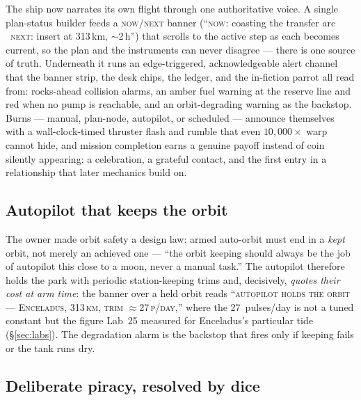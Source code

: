 \documentclass[10pt,twocolumn]{article}
\begin{document}
The ship now narrates its own flight through one authoritative voice. A single
plan-status builder feeds a \textsc{now}/\textsc{next} banner (``\textsc{now}: coasting the
transfer arc \textperiodcentered\ \textsc{next}: insert at 313\,km, $\sim$2\,h'') that
scrolls to the active step as each becomes current, so the plan and the instruments can
never disagree --- there is one source of truth. Underneath it runs an edge-triggered,
acknowledgeable alert channel that the banner strip, the desk chips, the ledger, and the
in-fiction parrot all read from: rocks-ahead collision alarms, an amber fuel warning at the
reserve line and red when no pump is reachable, and an orbit-degrading warning as the
backstop. Burns --- manual, plan-node, autopilot, or scheduled --- announce themselves with
a wall-clock-timed thruster flash and rumble that even $10{,}000\times$ warp cannot hide,
and mission completion earns a genuine payoff instead of coin silently appearing: a
celebration, a grateful contact, and the first entry in a relationship that later mechanics
build on.

\subsection{Autopilot that keeps the orbit}

The owner made orbit safety a design law: armed auto-orbit must end in a \emph{kept} orbit,
not merely an achieved one --- ``the orbit keeping should always be the job of autopilot
this close to a moon, never a manual task.'' The autopilot therefore holds the park with
periodic station-keeping trims and, decisively, \emph{quotes their cost at arm time}: the
banner over a held orbit reads ``\textsc{autopilot holds the orbit --- Enceladus, 313\,km,
trim $\approx$27\,p/day},'' where the 27~pulses/day is not a tuned constant but the figure
Lab~25 measured for Enceladus's particular tide (\S\ref{sec:labs}). The degradation alarm
is the backstop that fires only if keeping fails or the tank runs dry.

\subsection{Deliberate piracy, resolved by dice}
\end{document}
